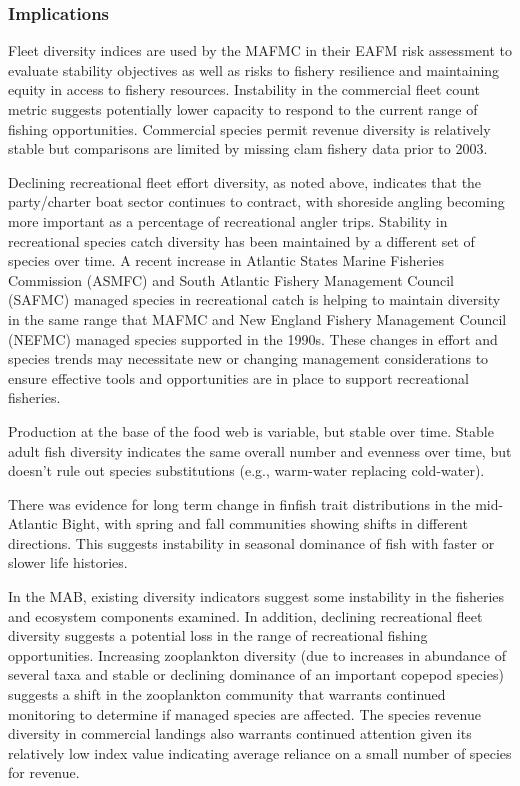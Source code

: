 \documentclass[
  10pt,
]{article}
\begin{document}
\hypertarget{implications-3}{%
\subsubsection{Implications}\label{implications-3}}

Fleet diversity indices are used by the MAFMC in their EAFM risk assessment to evaluate stability objectives as well as risks to fishery resilience and maintaining equity in access to fishery resources. Instability in the commercial fleet count metric suggests potentially lower capacity to respond to the current range of fishing opportunities. Commercial species permit revenue diversity is relatively stable but comparisons are limited by missing clam fishery data prior to 2003.

Declining recreational fleet effort diversity, as noted above, indicates that the party/charter boat sector continues to contract, with shoreside angling becoming more important as a percentage of recreational angler trips. Stability in recreational species catch diversity has been maintained by a different set of species over time. A recent increase in Atlantic States Marine Fisheries Commission (ASMFC) and South Atlantic Fishery Management Council (SAFMC) managed species in recreational catch is helping to maintain diversity in the same range that MAFMC and New England Fishery Management Council (NEFMC) managed species supported in the 1990s. These changes in effort and species trends may necessitate new or changing management considerations to ensure effective tools and opportunities are in place to support recreational fisheries.

Production at the base of the food web is variable, but stable over time. Stable adult fish diversity indicates the same overall number and evenness over time, but doesn't rule out species substitutions (e.g., warm-water replacing cold-water).

There was evidence for long term change in finfish trait distributions in the mid-Atlantic Bight, with spring and fall communities showing shifts in different directions. This suggests instability in seasonal dominance of fish with faster or slower life histories.

In the MAB, existing diversity indicators suggest some instability in the fisheries and ecosystem components examined. In addition, declining recreational fleet diversity suggests a potential loss in the range of recreational fishing opportunities. Increasing zooplankton diversity (due to increases in abundance of several taxa and stable or declining dominance of an important copepod species) suggests a shift in the zooplankton community that warrants continued monitoring to determine if managed species are affected. The species revenue diversity in commercial landings also warrants continued attention given its relatively low index value indicating average reliance on a small number of species for revenue.
\end{document}

